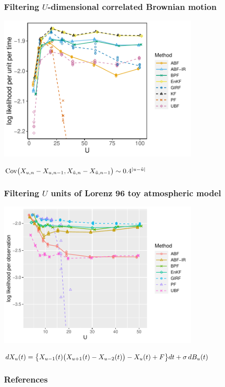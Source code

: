 \documentclass{beamer}
\begin{document}
\begin{frame}
\frametitle{Filtering $U$-dimensional correlated Brownian motion}

\vspace{-3mm}

\begin{center}
\includegraphics[width=10cm]{bm_alt_plot-1.pdf}

\vspace{-1mm}

$\mathrm{Cov}\big(X_{u,n}-X_{u,n-1},X_{\tilde u,n}-X_{\tilde u,n-1}\big) \sim 0.4^{|u-\tilde u|}_{}$

\end{center}

\end{frame}

\begin{frame}
\frametitle{Filtering $U$ units of Lorenz 96 toy atmospheric model} 

\vspace{-3mm}

\begin{center}
\includegraphics[width=10cm]{lz_loglik_plot-1.pdf}

\vspace{-1mm}

$dX_{u}(t) = \big \{  X_{u-1}(t) \big(X_{u+1}(t) - X_{u-2}(t)\big) - X_{u}(t) + F \big\} dt + \sigma \, dB_{u}(t)$

\end{center}

\end{frame}


\nocite{asfaw23arxiv,bjornstad01,breto19,grenfell04,he10,katzfuss19,ionides21,ionides22,lee20,li20,ng02,ning23-ibpf,park20,rebeschini15,wheeler23}

\begin{frame}[allowframebreaks]
\frametitle{References}


\end{frame}

\end{document}
